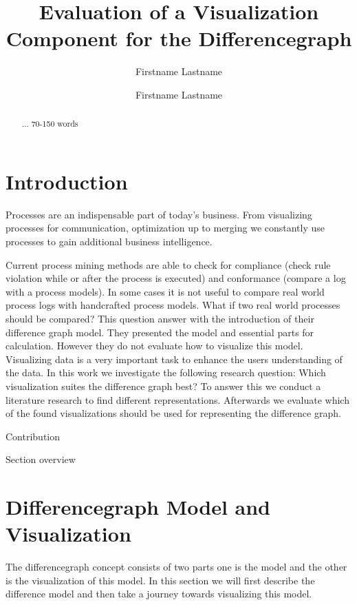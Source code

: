 \documentclass{llncs}
\begin{document}
\title{Evaluation of a Visualization Component for the Differencegraph}
\author{Firstname Lastname \and Firstname Lastname}
\maketitle
\begin{abstract}
...
70-150 words
\end{abstract}

\section{Introduction}
\label{sec:Introduction} %

Processes are an indispensable part of today’s business. From visualizing processes for communication, optimization up to merging we constantly use processes to gain additional business intelligence.

Current process mining methods are able to check for compliance (check rule violation while or after the process is executed) and conformance (compare a log with a process models).
In some cases it is not useful to compare real world process logs with handcrafted process models. What if two real world processes should be compared?
This question answer \cite{lit:VisuApprDiffAnalysis} with the introduction of their difference graph model. They presented the model and essential parts for calculation. However they do not evaluate how to visualize this model. Visualizing data is a very important task to enhance the users understanding of the data.
In this work we investigate the following research question: Which visualization suites the difference graph best? To answer this we conduct a literature research to find different representations. Afterwards we evaluate which of the found visualizations should be used for representing the difference graph.


Contribution

Section overview

\section{Differencegraph Model and Visualization} %
\label{sec:DiffgraphModel}
The differencegraph concept \cite{lit:VisuApprDiffAnalysis} consists of two parts one is the model and the other is the visualization of this model. In this section we will  first describe the difference model and then take a journey towards visualizing this model.
\end{document}
